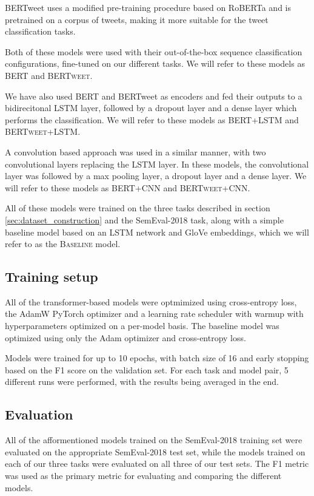 \documentclass[10pt, a4paper]{article}
\begin{document}
BERTweet uses a modified pre-training procedure based on RoBERTa \citep{roberta} and is pretrained on a corpus of tweets, 
making it more suitable for the tweet classification tasks.

Both of these models were used with their out-of-the-box sequence classification configurations, fine-tuned on our 
different tasks. We will refer to these models as \textsc{BERT} and \textsc{BERTweet}.

We have also used BERT and BERTweet as encoders and fed their outputs to a bidirecitonal LSTM layer, followed by 
a dropout layer and a dense layer which performs the classification. We will refer to these models as \textsc{BERT+LSTM}
and \textsc{BERTweet+LSTM}. 

A convolution based approach was used in a similar manner, with two convolutional layers
replacing the LSTM layer. In these models, the convolutional layer was followed by a max pooling layer, a dropout layer
and a dense layer. We will refer to these models as \textsc{BERT+CNN} and \textsc{BERTweet+CNN}.

All of these models were trained on the three tasks described in section \ref{sec:dataset_construction} and the SemEval-2018
task, along with a simple baseline model based on an LSTM network and GloVe embeddings, which we will refer to as the
\textsc{Baseline} model. 

\subsection{Training setup}
All of the transformer-based models were optmimized using cross-entropy loss, the AdamW PyTorch optimizer and a
learning rate scheduler with warmup with hyperparameters optimized on a per-model basis. The baseline model
was optimized using only the Adam optimizer and cross-entropy loss.

Models were trained for up to 10 epochs, with batch size of 16 and early stopping based on the F1 score on the validation set.
For each task and model pair, 5 different runs were performed, with the results being averaged in the end.

\subsection{Evaluation}
All of the afformentioned models trained on the SemEval-2018 training set were evaluated on the appropriate 
SemEval-2018 test set, while the models trained on each of our three tasks were evaluated on all three of our test sets. 
The F1 metric was used as the primary metric for evaluating and comparing the different models.
\end{document}
